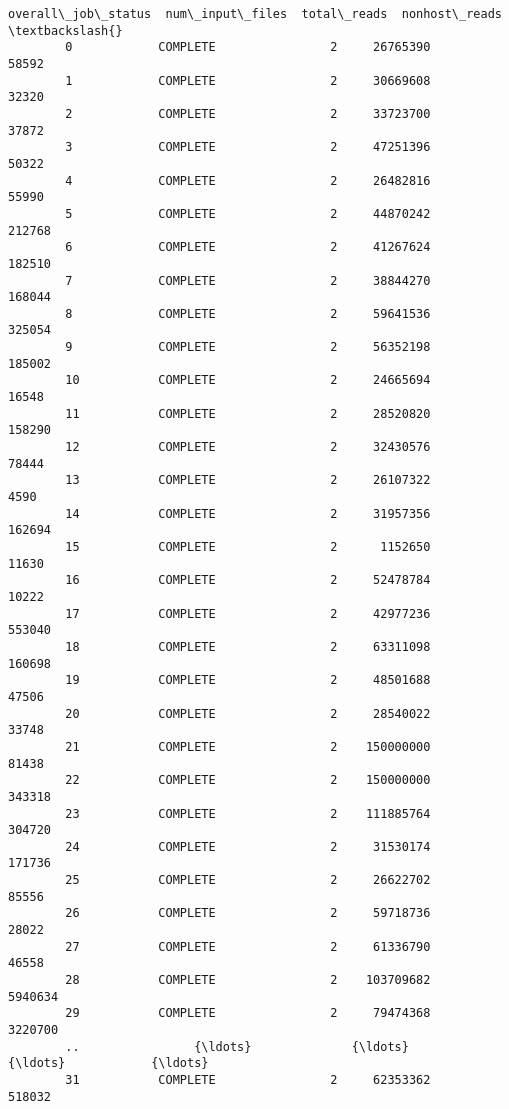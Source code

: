 \documentclass[11pt]{article}
\begin{document}
\begin{Verbatim}[commandchars=\\\{\}]
           overall\_job\_status  num\_input\_files  total\_reads  nonhost\_reads  \textbackslash{}
        0            COMPLETE                2     26765390          58592   
        1            COMPLETE                2     30669608          32320   
        2            COMPLETE                2     33723700          37872   
        3            COMPLETE                2     47251396          50322   
        4            COMPLETE                2     26482816          55990   
        5            COMPLETE                2     44870242         212768   
        6            COMPLETE                2     41267624         182510   
        7            COMPLETE                2     38844270         168044   
        8            COMPLETE                2     59641536         325054   
        9            COMPLETE                2     56352198         185002   
        10           COMPLETE                2     24665694          16548   
        11           COMPLETE                2     28520820         158290   
        12           COMPLETE                2     32430576          78444   
        13           COMPLETE                2     26107322           4590   
        14           COMPLETE                2     31957356         162694   
        15           COMPLETE                2      1152650          11630   
        16           COMPLETE                2     52478784          10222   
        17           COMPLETE                2     42977236         553040   
        18           COMPLETE                2     63311098         160698   
        19           COMPLETE                2     48501688          47506   
        20           COMPLETE                2     28540022          33748   
        21           COMPLETE                2    150000000          81438   
        22           COMPLETE                2    150000000         343318   
        23           COMPLETE                2    111885764         304720   
        24           COMPLETE                2     31530174         171736   
        25           COMPLETE                2     26622702          85556   
        26           COMPLETE                2     59718736          28022   
        27           COMPLETE                2     61336790          46558   
        28           COMPLETE                2    103709682        5940634   
        29           COMPLETE                2     79474368        3220700   
        ..                {\ldots}              {\ldots}          {\ldots}            {\ldots}   
        31           COMPLETE                2     62353362         518032   

\end{Verbatim}
\end{document}
